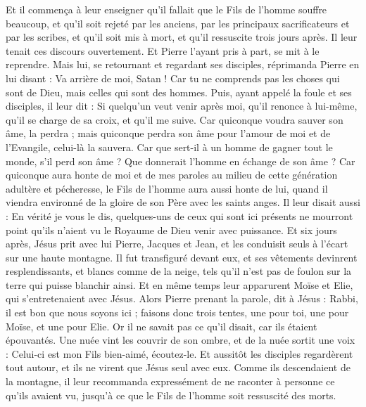 \begin{multicols}{2}
Et il commença à leur enseigner qu'il fallait que le Fils de l'homme souffre beaucoup, et qu'il soit rejeté par les anciens, par les principaux sacrificateurs et par les scribes, et qu'il soit mis à mort, et qu'il ressuscite trois jours après.
Il leur tenait ces discours ouvertement. Et Pierre l’ayant pris à part, se mit à le reprendre.
Mais lui, se retournant et regardant ses disciples, réprimanda Pierre en lui disant : Va arrière de moi, Satan ! Car tu ne comprends pas les choses qui sont de Dieu, mais celles qui sont des hommes.
Puis, ayant appelé la foule et ses disciples, il leur dit : Si quelqu’un veut venir après moi, qu'il renonce à lui-même, qu'il se charge de sa croix, et qu’il me suive.
Car quiconque voudra sauver son âme, la perdra ; mais quiconque perdra son âme pour l'amour de moi et de l'Evangile, celui-là la sauvera.
Car que sert-il à un homme de gagner tout le monde, s'il perd son âme ?
Que donnerait l'homme en échange de son âme ?
Car quiconque aura honte de moi et de mes paroles au milieu de cette génération adultère et pécheresse, le Fils de l'homme aura aussi honte de lui, quand il viendra environné de la gloire de son Père avec les saints anges.
\VerseOne{}Il leur disait aussi : En vérité je vous le dis, quelques-uns de ceux qui sont ici présents ne mourront point qu’ils n’aient vu le Royaume de Dieu venir avec puissance.
Et six jours après, Jésus prit avec lui Pierre, Jacques et Jean, et les conduisit seuls à l'écart sur une haute montagne. Il fut transfiguré devant eux,
et ses vêtements devinrent resplendissants, et blancs comme de la neige, tels qu'il n’est pas de foulon sur la terre qui puisse blanchir ainsi.
Et en même temps leur apparurent Moïse et Elie, qui s’entretenaient avec Jésus.
Alors Pierre prenant la parole, dit à Jésus : Rabbi, il est bon que nous soyons ici ; faisons donc trois tentes, une pour toi, une pour Moïse, et une pour Elie.
Or il ne savait pas ce qu'il disait, car ils étaient épouvantés.
Une nuée vint les couvrir de son ombre, et de la nuée sortit une voix : Celui-ci est mon Fils bien-aimé, écoutez-le.
Et aussitôt les disciples regardèrent tout autour, et ils ne virent que Jésus seul avec eux.
Comme ils descendaient de la montagne, il leur recommanda expressément de ne raconter à personne ce qu'ils avaient vu, jusqu’à ce que le Fils de l'homme soit ressuscité des morts.

\end{multicols}
